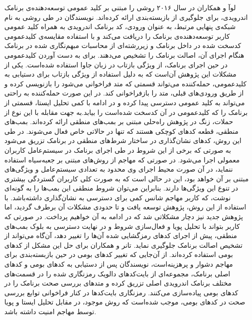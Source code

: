لوآ و همکاران در سال ۲۰۱۶ روشی را مبتنی بر کلید عمومی توسعه‌دهنده‌ی برنامک اندرویدی، برای جلوگیری از بازبسته‌بندی ارائه کرده‌اند. نویسندگان در طی روشی به نام شبکه‌ی پنهایی مرتبط‌، به عنوان ورودی، کد برنامک اندرویدی به همراه کلید عمومی کاربر توسعه‌دهنده‌ی برنامک را دریافت می‌کند و با استفاده  مقایسه‌ی کلید‌عمومی کد‌سخت شده در داخل برنامک و زیررشته‌ای از محاسبات مبهم‌نگاری شده در برنامک هنگام اجرای آن، اصالت برنامک را تشخیص می‌دهند. برای به ‌دست آوردن کلید‌عمومی در حین اجرای برنامک، از ویژگی بازتاب در زبان جاوا استفاده شده‌است. یکی از مشکلات این پژوهش آن‌است که به دلیل استفاده از ویژگی بازتاب برای دستیابی به کلید‌عمومی، حمله‌کننده می‌تواند قسمتی که متد فراخوانی می‌شود را بازنویسی کرده و از طریق ورودی‌های قبلی، متد را بازفراخوانی کند. در این صورت حمله‌کننده به راحتی می‌تواند به کلید عمومی دسترسی پیدا کرده و در ادامه با کمی تحلیل ایستا، قسمتی از برنامک را که کلید‌عمومی در آن کد‌سخت شده‌است را بیابد.به جهت مقابله با این نوع از حملات، زنگ در پژوهش راه‌حلی مبتنی بر بمب‌های منطقی‌ ارا‌ئه کرده‌اند. بمب‌های منطقی، قطعه‌ کد‌های کوچکی هستند که تنها در حالاتی خاص فعال می‌شوند. در طی این روش، کد‌های نشان‌گذاری در ساختار شرط‌های منطقی در برنامک تزریق می‌شود به صورتی که برخی از این شروط‌ در طی اجرای برنامک در سیستم‌عامل کاربران معمولی اجرا می‌شود. در صورتی که مهاجم از روش‌های مبتنی بر جعبه‌سیاه استفاده ننماید، در آن صورت محیط اجرای وی محدود به تعدادی سیستم‌عامل و ویژگی‌های مبتنی بر آن خواهد بود، این در حالی است که به صورت کلی کاربران گستردگی بیشتری در تنوع این ویژگی‌ها دارند. بنابراین می‌توان شروط منطقی این بمب‌ها را به گونه‌ای نوشت، که کاربر مهاجم شانس کمی برای دسترسی به نشان‌گذاری داشته‌باشد. با استفاده از این روش، پژوهش  توسعه یافت و تا حدودی مشکلات آن برطرف گردید، اما پژوهش جدید نیز دچار مشکلاتی شد که در ادامه به آن خواهیم پرداخت. در صورتی که کاربر بتواند با تحلیل پویا و فعال‌سازی شروط و در نهایت دسترسی به بلوک بمب‌های منطقی، پیش از اجرای کد‌های رمزگشایی شده آن‌ها را تغییر دهد، آن‌گاه می‌تواند از تشخیص اصالت برنامک جلوگیری نماید. تانر و همکاران برای حل این مشکل از کد‌های بومی استفاده کرده‌اند. از آن‌جایی که تغییر کد‌های بومی در حین بازبسته‌بندی برای مهاجم دشوار و پرهزینه‌است، نویسندگان پس از دستیابی به کد‌های بومی و کد‌های اصلی برنامک، مجموعه‌ای از بایت‌کد‌های دالویک رمز‌نگاری شده را در قسمت‌های مختلف برنامک اندرویدی اصلی تزریق کرده و متد‌های بررسی صحت برنامک را در کد‌های بومی پیاده‌سازی می‌کنند. رمز‌نگاری بایت‌کد‌ها در کنار فراخوانی توابع بررسی صحت در کدهای بومی، موجب شده‌است که روش موجود، در مقابل تحلیل ایستا و پویا توسط مهاجم امنیت داشته باشد.
